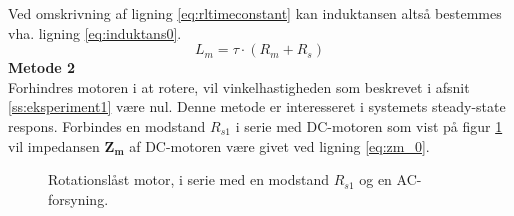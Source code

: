 Ved omskrivning af ligning \ref{eq:rltimeconstant} kan induktansen altså bestemmes vha. ligning \ref{eq:induktans0}.
\begin{equation}
	L_m=\tau\cdot(R_m+R_s)
	\label{eq:induktans0} 
 \end{equation}
\textbf{Metode 2}\\
Forhindres motoren i at rotere, vil vinkelhastigheden som beskrevet i afsnit \ref{ss:eksperiment1} være nul.
Denne metode er interesseret i systemets steady-state respons.
Forbindes en modstand \(R_{s1}\) i serie med DC-motoren som vist på figur \ref{fig:eksperiment2metode2}
vil impedansen \(\mathbf{Z_m}\) af DC-motoren være givet ved ligning \ref{eq:zm_0}.
\begin{figure}[!th]
\centering
\begin{circuitikz}
  
\end{circuitikz}
\caption[Rotationslåst motor med \(R_s1\)]{Rotationslåst motor, i serie med en modstand \(R_{s1}\) og en AC-forsyning.}
\label{fig:eksperiment2metode2}
\end{figure}


